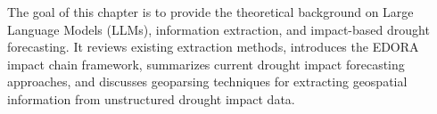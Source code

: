 The goal of this chapter is to provide the theoretical background on Large Language Models (LLMs), information extraction, and impact-based drought forecasting. It reviews existing extraction methods, introduces the EDORA impact chain framework, summarizes current drought impact forecasting approaches, and discusses geoparsing techniques for extracting geospatial information from unstructured drought impact data.